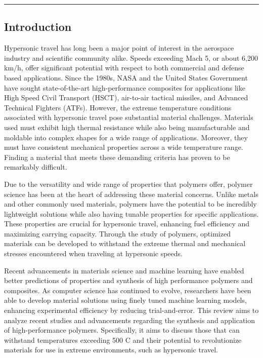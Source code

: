 \documentclass[12pt]{article}
\begin{document}
\vspace{1em}
\hrule height 1pt

\begin{multicols}{2}

\section{Introduction}

\indent Hypersonic travel has long been a major point of interest in the aerospace industry and scientific community alike. Speeds exceeding Mach 5, or about 6,200 km/h, offer significant potential with respect to both commercial and defense based applications. Since the 1980s, NASA and the United States Government have sought state-of-the-art high-performance composites for applications like High Speed Civil Transport (HSCT), air-to-air tactical missiles, and Advanced Technical Fighters (ATFs). \citep{Lau2014} However, the extreme temperature conditions associated with hypersonic travel pose substantial material challenges. Materials used must exhibit high thermal resistance while also being manufacturable and moldable into complex shapes for a wide range of applications. Moreover, they must have consistent mechanical properties across a wide temperature range. Finding a material that meets these demanding criteria has proven to be remarkably difficult.
	
\indent Due to the versatility and wide range of properties that polymers offer, polymer science has been at the heart of addressing these material concerns. Unlike metals and other commonly used materials, polymers have the potential to be incredibly lightweight solutions while also having tunable properties for specific applications. These properties are crucial for hypersonic travel, enhancing fuel efficiency and maximizing carrying capacity. Through the study of polymers, optimized materials can be developed to withstand the extreme thermal and mechanical stresses encountered when traveling at hypersonic speeds. 

\indent Recent advancements in materials science and machine learning have enabled better predictions of properties and synthesis of high performance polymers and composites. As computer science has continued to evolve, researchers have been able to develop material solutions using finely tuned machine learning models, enhancing experimental efficiency by reducing trial-and-error. This review aims to analyze recent studies and advancements regarding the synthesis and application of high-performance polymers. Specifically, it aims to discuss those that can withstand temperatures exceeding 500 \degree C and their potential to revolutionize materials for use in extreme environments, such as hypersonic travel.
	

\end{multicols}
\end{document}
